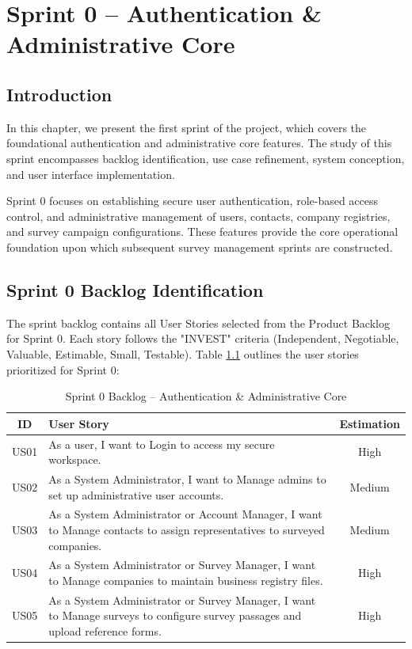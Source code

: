 \documentclass[12pt,a4paper]{report}
\begin{document}
\chapter{Sprint 0 -- Authentication \& Administrative Core}

\section{Introduction}
In this chapter, we present the first sprint of the project, which covers the foundational authentication and administrative core features. The study of this sprint encompasses backlog identification, use case refinement, system conception, and user interface implementation.

Sprint 0 focuses on establishing secure user authentication, role-based access control, and administrative management of users, contacts, company registries, and survey campaign configurations. These features provide the core operational foundation upon which subsequent survey management sprints are constructed.

\section{Sprint 0 Backlog Identification}
The sprint backlog contains all User Stories selected from the Product Backlog for Sprint 0. Each story follows the "INVEST" criteria (Independent, Negotiable, Valuable, Estimable, Small, Testable). Table \ref{tab:sprint0_backlog} outlines the user stories prioritized for Sprint 0:

\begin{table}[H]
\centering
\caption{Sprint 0 Backlog -- Authentication \& Administrative Core}
\label{tab:sprint0_backlog}
\vspace{0.3cm}
\renewcommand{\arraystretch}{1.3}
\begin{tabular}{|c|p{9.5cm}|c|}
\hline
\textbf{ID} & \textbf{User Story} & \textbf{Estimation} \\ \hline
US01 & As a user, I want to Login to access my secure workspace. & High \\ \hline
US02 & As a System Administrator, I want to Manage admins to set up administrative user accounts. & Medium \\ \hline
US03 & As a System Administrator or Account Manager, I want to Manage contacts to assign representatives to surveyed companies. & Medium \\ \hline
US04 & As a System Administrator or Survey Manager, I want to Manage companies to maintain business registry files. & High \\ \hline
US05 & As a System Administrator or Survey Manager, I want to Manage surveys to configure survey passages and upload reference forms. & High \\ \hline
\end{tabular}
\end{table}
\end{document}
